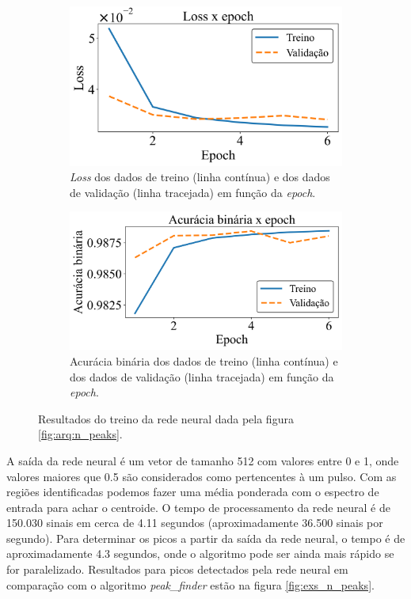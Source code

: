 \documentclass[a4paper,12pt,oneside]{book}
\begin{document}
\begin{figure}[H]
\centering
    \begin{subfigure}[t]{0.49\textwidth}
        \centering
        \includegraphics[scale=0.42]{figs/n_peaks_loss.png}
        \caption{\textit{Loss} dos dados de treino (linha contínua) e dos dados de validação (linha tracejada) em função da \textit{epoch}.}
        \label{subfig:n_peaks_loss}
    \end{subfigure}%
    \hfill
    \begin{subfigure}[t]{0.46\textwidth}
        \centering
        \includegraphics[scale=0.42]{figs/n_peaks_metric.png}
        \caption{Acurácia binária dos dados de treino (linha contínua) e dos dados de validação (linha tracejada) em função da \textit{epoch}.}
        \label{subfig:n_peaks_metric}
    \end{subfigure}
\caption{Resultados do treino da rede neural dada pela figura \ref{fig:arq:n_peaks}.}
\label{fig:n_peaks_results}
\end{figure}

\par A saída da rede neural é um vetor de tamanho 512 com valores entre 0 e 1, onde valores maiores que 0.5 são considerados como pertencentes à um pulso. Com as regiões identificadas podemos fazer uma média ponderada com o espectro de entrada para achar o centroide. O tempo de processamento da rede neural é de 150.030 sinais em cerca de 4.11 segundos (aproximadamente 36.500 sinais por segundo). Para determinar os picos a partir da saída da rede neural, o tempo é de aproximadamente 4.3 segundos, onde o algoritmo pode ser ainda mais rápido se for paralelizado. Resultados para picos detectados pela rede neural em comparação com o algoritmo \textit{peak\_finder} estão na figura \ref{fig:exs_n_peaks}.
\end{document}
